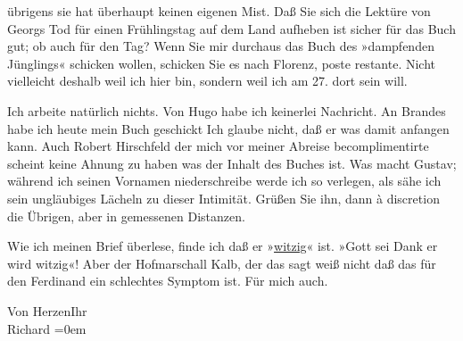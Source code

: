               übrigens sie hat überhaupt keinen eigenen Mist. Daß Sie sich die Lektüre von Georgs Tod für einen Frühlingstag auf dem Land
               aufheben ist sicher für das Buch gut; ob auch für den Tag? Wenn Sie mir durchaus das
                  Buch des »dampfenden Jünglings« schicken wollen,
               schicken Sie es nach Florenz, poste {\pb}restante. Nicht vielleicht deshalb
               weil ich hier bin, sondern weil ich am 27. dort sein will.\pend
           
\pstart
           Ich arbeite natürlich nichts. Von Hugo habe
               ich keinerlei Nachricht. An Brandes habe ich
               heute mein Buch geschickt Ich
               glaube nicht, daß er was damit anfangen kann. Auch Robert Hirschfeld der mich vor meiner Abreise becomplimentirte scheint keine
               Ahnung zu haben was der Inhalt des Buches ist. Was macht Gustav; während
               ich seinen Vornamen niederschreibe werde ich so verlegen, als sähe ich sein
               ungläubiges Lächeln zu dieser Intimität. Grüßen Sie ihn, dann à discretion die
               Übrigen, aber in gemessenen Distanzen.\pend
           
\pstart
           Wie ich meinen Brief überlese, finde ich daß er »\uline{witzig}« ist. »Gott sei
                  Dank er wird witzig«! Aber der Hofmarschall Kalb, der das sagt weiß nicht daß das für den Ferdinand ein schlechtes
               Symptom ist. Für mich auch.\pend
           
\pstart
           Von Herzen\hspace*{1.5em}Ihr{\\[\baselineskip]}\spacefill\mbox{Richard}\pend
           \leftskip=0em{}\endnumbering{}  
      